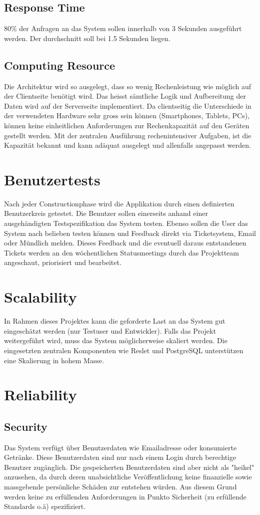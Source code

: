 \documentclass[10pt,a4paper]{scrartcl}
\begin{document}
\subsection{Response Time}
80\% der Anfragen an das System sollen innerhalb von 3 Sekunden ausgeführt werden.
Der durchschnitt soll bei 1.5 Sekunden liegen.
\subsection{Computing Resource}
Die Architektur wird so ausgelegt, dass so wenig Rechenleistung wie möglich auf der Clientseite benötigt wird. Das heisst sämtliche Logik und Aufbereitung der Daten wird auf der Serverseite implementiert. Da clientseitig die Unterschiede in der verwendeten Hardware sehr gross sein können (Smartphones, Tablets, PCs), können keine einheitlichen Anforderungen zur Rechenkapazität auf den Geräten gestellt werden. Mit der zentralen Ausführung rechenintensiver Aufgaben, ist die Kapazität bekannt und kann adäquat ausgelegt und allenfalls angepasst werden.

\section{Benutzertests}
Nach jeder Constructionphase wird die Applikation durch einen definierten Benutzerkreis getestet. Die Benutzer sollen einerseits anhand einer ausgehändigten Testspezifikation das System testen. Ebenso sollen die User das System nach belieben testen können und Feedback direkt via Ticketsystem, Email oder Mündlich melden. Dieses Feedback und die eventuell daraus entstandenen Tickets werden an den wöchentlichen Statusmeetings durch das Projektteam angeschaut, priorisiert und bearbeitet.

\section{Scalability}
In Rahmen dieses Projektes kann die geforderte Last an das System gut eingeschätzt werden (nur Testuser und Entwickler). Falls das Projekt weitergeführt wird, muss das System möglicherweise skaliert werden. Die eingesetzten zentralen Komponenten wie Reslet und PostgreSQL unterstützen eine Skalierung in hohem Masse.

\section{Reliability}
\subsection{Security}
Das System verfügt über Benutzerdaten wie Emailadresse oder konsumierte Getränke. Diese Benutzerdaten sind nur nach einem Login durch berechtige Benutzer zugänglich. Die gespeicherten Benutzerdaten sind aber nicht als "heikel" anzusehen, da durch deren unabsichtliche Veröffentlichung keine finanzielle sowie massgebende persönliche Schäden zur entstehen würden. Aus diesem Grund werden keine zu erfüllenden Anforderungen in Punkto Sicherheit (zu erfüllende Standards o.ä) spezifiziert.
\end{document}
